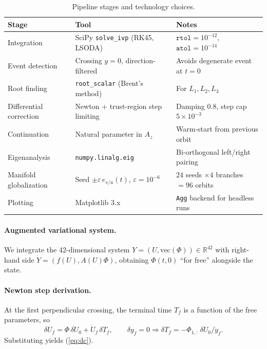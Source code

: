 \documentclass[11pt,a4paper]{article}
\begin{document}
\begin{table}[H]
\centering
\caption{Pipeline stages and technology choices.}
\begin{tabularx}{\textwidth}{@{}l l X@{}}
\toprule
\textbf{Stage} & \textbf{Tool} & \textbf{Notes} \\
\midrule
Integration          & SciPy \texttt{solve\_ivp} (RK45, LSODA) & $\texttt{rtol}{=}10^{-12}$, $\texttt{atol}{=}10^{-14}$ \\
Event detection      & Crossing $y=0$, direction-filtered      & Avoids degenerate event at $t=0$ \\
Root finding         & \texttt{root\_scalar} (Brent's method)   & For $L_1, L_2, L_3$ \\
Differential correction & Newton + trust-region step limiting & Damping $0.8$, step cap $5\times 10^{-3}$ \\
Continuation         & Natural parameter in $A_z$              & Warm-start from previous orbit \\
Eigenanalysis        & \texttt{numpy.linalg.eig}                & Bi-orthogonal left/right pairing \\
Manifold globalization & Seed $\pm\varepsilon\,e_{s/u}(t)$, $\varepsilon{=}10^{-6}$ & $24$ seeds $\times 4$ branches $= 96$ orbits \\
Plotting             & Matplotlib 3.x                          & \texttt{Agg} backend for headless runs \\
\bottomrule
\end{tabularx}
\end{table}

\paragraph{Augmented variational system.}
We integrate the 42-dimensional system $Y = (U, \mathrm{vec}(\Phi)) \in \mathbb{R}^{42}$ with right-hand side $\dot Y = (f(U), A(U)\Phi)$, obtaining $\Phi(t,0)$ ``for free'' alongside the state.

\paragraph{Newton step derivation.}
At the first perpendicular crossing, the terminal time $T_f$ is a function of the free parameters, so
\begin{equation}
\delta U_f = \Phi\,\delta U_0 + \dot U_f \,\delta T_f,
\qquad
\delta y_f = 0 \Rightarrow \delta T_f = -\Phi_{1,:}\,\delta U_0 / \dot y_f.
\end{equation}
Substituting yields (\ref{eq:dc}).
\end{document}
